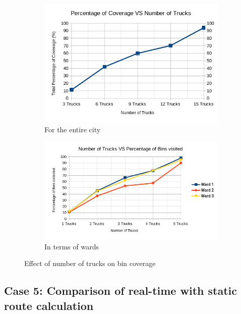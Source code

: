 \documentclass[12pt]{article}
\begin{document}
\begin{figure}[H]
    \centering
    \begin{subfigure}{0.5\textwidth}
        \centering
        \includegraphics[width=\linewidth]{coverage_VS_number_of_trucks.png}
        \caption{For the entire city}\label{figc1}
    \end{subfigure}%
    \begin{subfigure}{0.5\textwidth}
        \centering
        \includegraphics[width=\linewidth]{number_of_trucks_VS_bins_visited.png}
        \caption{In terms of wards}\label{figc2}
    \end{subfigure}
    \caption{Effect of number of trucks on bin coverage}
    \label{fig3}
\end{figure}

\subsection*{Case 5: Comparison of real-time with static route calculation}
\end{document}
